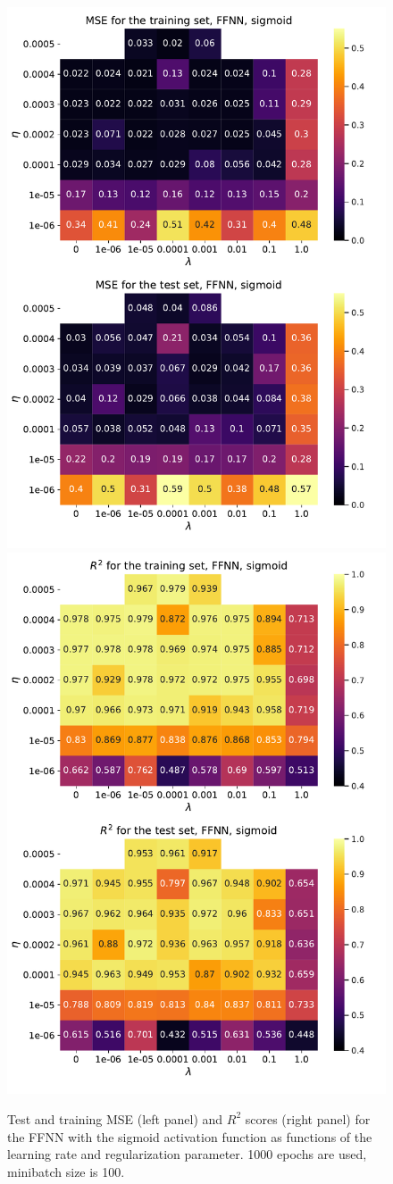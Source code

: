 \documentclass[numberedappendix, twocolappendix]{emulateapj}
\begin{document}
\begin{figure}[!htb]
    \centering
    \includegraphics[width=.49\textwidth]{Figures/NN_sigmoid_MSE.pdf}
    \includegraphics[width=.49\textwidth]{Figures/NN_sigmoid_R2.pdf}
    \caption{Test and training MSE (left panel) and $R^2$ scores (right panel) for the FFNN with the sigmoid activation function as functions of the learning rate and regularization parameter. 1000 epochs are used, minibatch size is 100.}
    \label{fig: FFNN+Sigmoid scores}
\end{figure}
\end{document}

